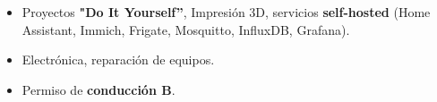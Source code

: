 \documentclass[10pt,a4paper,ragged2e,withhyper]{altacv}
\begin{document}
\begin{paracol}{2}

\begin{itemize}
    \setlength{\itemindent}{0.5em}
    \item Proyectos \textbf{"Do It Yourself”}, Impresión 3D, servicios \textbf{self-hosted} (Home Assistant, Immich, Frigate, Mosquitto, InfluxDB, Grafana).
    \item Electrónica, reparación de equipos.
    \item Permiso de \textbf{conducción B}.
\end{itemize}













\end{paracol}
\end{document}
